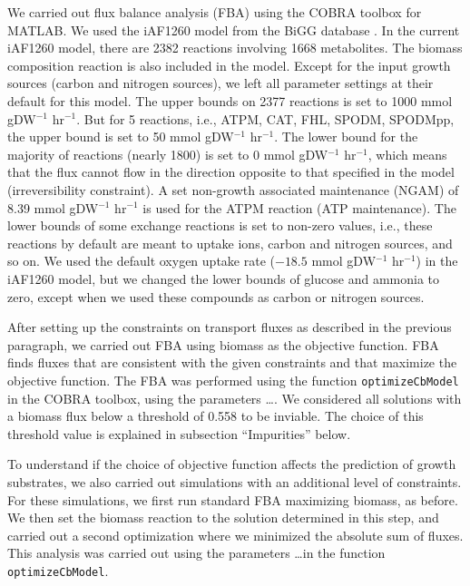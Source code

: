 \documentclass[12pt]{article}
\begin{document}
We carried out flux balance analysis (FBA) using the COBRA toolbox \cite{Schellenbergeretal2011} for MATLAB. 
We used the iAF1260 model from the BiGG database \cite{Schellenbergeretal2010}. In the current iAF1260 model, there are 2382 reactions involving 1668 metabolites. The biomass composition reaction is also included in the model. Except for the input growth sources (carbon and nitrogen sources), we left all parameter settings at their default for this model. The upper bounds on 2377 reactions is set to 1000  mmol gDW$^{-1}$ hr$^{-1}$. But for 5 reactions, i.e., ATPM, CAT, FHL, SPODM, SPODMpp, the upper bound is set to 50 mmol gDW$^{-1}$ hr$^{-1}$. The lower bound for the majority of reactions (nearly 1800) is set to 0 mmol gDW$^{-1}$ hr$^{-1}$, which means that the flux cannot flow in the direction opposite to that specified in the model (irreversibility constraint). A set non-growth associated maintenance (NGAM) of 8.39  mmol gDW$^{-1}$ hr$^{-1}$ is used for the ATPM reaction (ATP maintenance). The lower bounds of some exchange reactions is set to non-zero values, i.e., these reactions by default are meant to uptake ions, carbon and nitrogen sources, and so on. We used the default oxygen uptake rate ($-18.5$ mmol gDW$^{-1}$ hr$^{-1}$) in the iAF1260 model, but we changed the lower bounds of glucose and ammonia to zero, except when we used these compounds as carbon or nitrogen sources.

After setting up the constraints on transport fluxes as described in the previous paragraph, we carried out FBA using biomass as the objective function. FBA finds fluxes that are consistent with the given constraints and that maximize the objective function. The FBA was performed using the function \texttt{optimizeCbModel} in the COBRA toolbox, {\color{red}using the parameters \dots}. We considered all solutions with a biomass flux below a threshold of 0.558 to be inviable. The choice of this threshold value is explained in subsection ``Impurities'' below.

To understand if the choice of objective function affects the prediction of growth substrates, we also carried out simulations with an additional level of constraints. For these simulations, we first run standard FBA maximizing biomass, as before. We then set the biomass reaction to the solution determined in this step, and carried out a second optimization where we minimized the absolute sum of fluxes. {\color{red}This analysis was carried out using the parameters \dots in the function \texttt{optimizeCbModel}.}
\end{document}
